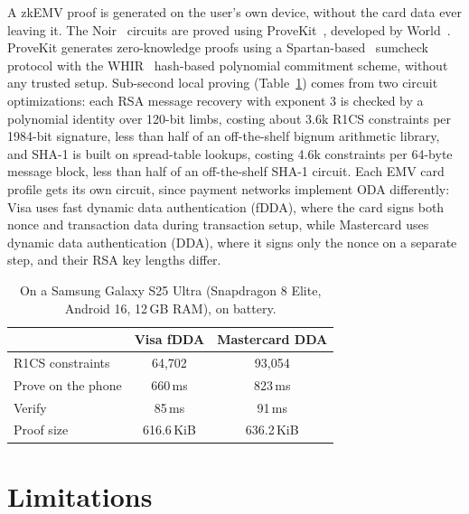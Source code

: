 \documentclass[10pt,a4paper]{article}
\begin{document}
A zkEMV proof is generated on the user's own device, without the card data ever leaving it.
The Noir~\cite{noir} circuits are proved using ProveKit~\cite{provekit}, developed by World~\cite{world-provekit}.
ProveKit generates zero-knowledge proofs using a Spartan-based~\cite{DBLP:conf/crypto/Setty20} sumcheck protocol with the WHIR~\cite{DBLP:conf/eurocrypt/ArnonCFY25} hash-based polynomial commitment scheme, without any trusted setup.
Sub-second local proving (Table~\ref{table:perf}) comes from two circuit optimizations: each RSA message recovery with exponent 3 is checked by a polynomial identity over 120-bit limbs, costing about 3.6k R1CS constraints per 1984-bit signature, less than half of an off-the-shelf bignum arithmetic library, and SHA-1 is built on spread-table lookups, costing 4.6k constraints per 64-byte message block, less than half of an off-the-shelf SHA-1 circuit.
Each EMV card profile gets its own circuit, since payment networks implement ODA differently: Visa uses fast dynamic data authentication (fDDA), where the card signs both nonce and transaction data during transaction setup, while Mastercard uses dynamic data authentication (DDA), where it signs only the nonce on a separate step, and their RSA key lengths differ.

\begin{table}[ht]
\centering
\begin{tabular}{@{}lcc@{}}
\toprule
& Visa fDDA & Mastercard DDA \\
\midrule
R1CS constraints & 64,702 & 93,054 \\
Prove on the phone & 660\,ms & 823\,ms \\
Verify & 85\,ms & 91\,ms \\
Proof size & 616.6\,KiB & 636.2\,KiB \\
\bottomrule
\end{tabular}
\caption{On a Samsung Galaxy S25 Ultra (Snapdragon 8 Elite, Android 16, 12\,GB RAM), on battery.}
\label{table:perf}
\end{table}

\section{Limitations}
\end{document}
